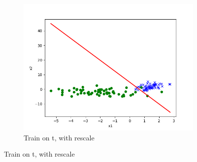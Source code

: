 \begin{answer}
\begin{figure}[htbp]
\begin{subfigure}[b]{0.3\linewidth}
        \includegraphics[width=\linewidth]{pics/p02e.png}
        \caption{Train on t, with rescale}
    \end{subfigure}

\end{figure}
\end{answer}

